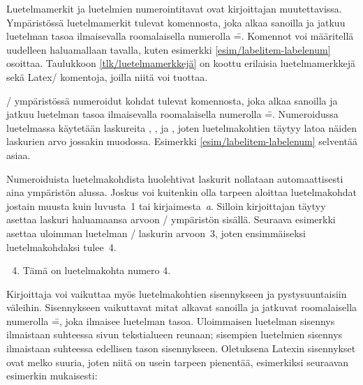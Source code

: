 Luetelmamerkit ja luetelmien numerointitavat ovat kirjoittajan
muutettavissa. Ympäristössä  luetelmamerkit tulevat
komennosta, joka alkaa sanoilla  ja jatkuu
luetelman tasoa ilmaisevalla roomalaisella numerolla
\==. Komennot voi määritellä uudelleen haluamallaan
tavalla, kuten esimerkki \ref{esim/labelitem-labelenum} osoittaa.
Taulukkoon \ref{tlk/luetelmamerkkejä} on koottu erilaisia
luetelmamerkkejä sekä Latex\-/ komentoja, joilla niitä voi tuottaa.

\-/ ympäristössä numeroidut kohdat tulevat
komennosta, joka alkaa sanoilla  ja jatkuu
luetelman tasoa ilmaisevalla roomalaisella numerolla
\==. Numeroidussa luetelmassa käytetään laskureita
, ,  ja
, joten luetelmakohtien täytyy latoa näiden laskurien
arvo jossakin muodossa. Esimerkki \ref{esim/labelitem-labelenum}
selventää asiaa.

Numeroiduista luetelmakohdista huolehtivat laskurit nollataan
automaattisesti aina ympäristön alussa. Joskus voi kuitenkin olla
tarpeen aloittaa luetelmakohdat jostain muusta kuin luvusta~1 tai
kirjaimesta~\textit{a}. Silloin kirjoittajan täytyy asettaa laskuri
haluamaansa arvoon \-/ ympäristön sisällä. Seuraava
esimerkki asettaa uloimman luetelman \-/ laskurin
arvoon~3, joten ensimmäiseksi luetelmakohdaksi tulee~4.

\begin{koodilohkosis}
\begin{enumerate}
  \setcounter{enumi}{3}
\item Tämä on luetelmakohta numero 4.
\end{enumerate}
\end{koodilohkosis}

\noindent
Kirjoittaja voi vaikuttaa myös luetelmakohtien sisennykseen ja
pystysuuntaisiin väleihin. Sisennykseen vaikuttavat mitat alkavat
sanoilla  ja jatkuvat roomalaisella numerolla
\==, joka ilmaisee luetelman tasoa. Uloimmaisen
luetelman sisennys ilmaistaan suhteessa sivun tekstialueen reunaan;
sisempien luetelmien sisennys ilmaistaan suhteessa edellisen tason
sisennykseen. Oletuksena Latexin sisennykset ovat melko suuria, joten
niitä on usein tarpeen pienentää, esimerkiksi seuraavan esimerkin
mukaisesti:

